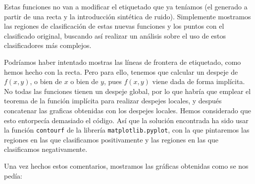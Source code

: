 \documentclass[11pt]{article}
\begin{document}
Estas funciones no van a modificar el etiquetado que ya teníamos (el generado a partir de una recta y la introducción sintética de ruido). Simplemente mostramos las regiones de clasificación de estas nuevas funciones y los puntos con el clasificado original, buscando así realizar un análisis sobre el uso de estos clasificadores más complejos.

Podríamos haber intentado mostras las líneas de frontera de etiquetado, como hemos hecho con la recta. Pero para ello, tenemos que calcular un despeje de $f(x, y)$, o bien de $x$ o bien de $y$, pues $f(x, y)$ viene dada de forma implícita. No todas las funciones tienen un despeje global, por lo que habría que emplear el teorema de la función implícita para realizar despejes locales, y después concatenar las graficas obtenidas con los despejes locales. Hemos considerado que esto entorpecía demasiado el código. Así que la solución encontrada ha sido usar la función \lstinline{contourf} de la librería \lstinline{matplotlib.pyplot}, con la que pintaremos las regiones en las que clasificamos positivamente y las regiones en las que clasificamos negativamente.

Una vez hechos estos comentarios, mostramos las gráficas obtenidas como se nos pedía:
\end{document}
